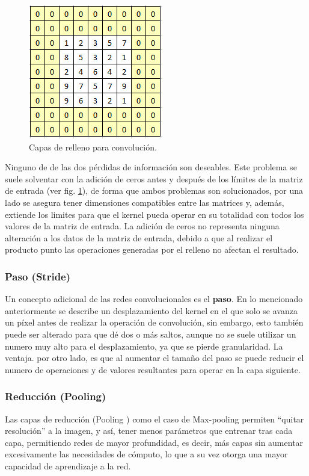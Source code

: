             \begin{figure}[ht!]
            	\centering
            	\includegraphics[width=0.4\linewidth]{imgs/02-Referential/02-Padding.png}
            	\caption[Capas de relleno para convolución]{Capas de relleno para convolución.}
        	    \label{fig:ConvolutionPadding}
            \end{figure}%
            
            Ninguno de de las dos pérdidas de información son deseables. Este problema se suele solventar con la adición de ceros antes y después de los límites de la matriz de entrada (ver fig. \ref{fig:ConvolutionPadding}), de forma que ambos problemas son solucionados, por una lado se asegura tener dimensiones compatibles entre las matrices y, además, extiende los limites para que el kernel pueda operar en su totalidad con todos los valores de la matriz de entrada. La adición de ceros no representa ninguna alteración a los datos de la matriz de entrada, debido a que al realizar el producto punto las operaciones generadas por el relleno no afectan el resultado.
            
        \subsubsection{Paso (Stride)}
            Un concepto adicional de las redes convolucionales es el \textbf{paso}. En lo mencionado anteriormente se describe un desplazamiento del kernel en el que solo se avanza un píxel antes de realizar la operación de convolución, sin embargo, esto también puede ser alterado para que dé dos o más saltos, aunque no se suele utilizar un numero muy alto para el desplazamiento, ya que se pierde granularidad. La ventaja. por otro lado, es que al aumentar el tamaño del paso se puede reducir el numero de operaciones y de valores resultantes para operar en la capa siguiente. 

        \subsubsection{Reducción (Pooling)}
            Las capas de reducción (Pooling ) como el caso de Max-pooling permiten “quitar resolución” a la imagen, y así, tener menos parámetros que entrenar tras cada capa, permitiendo redes de mayor profundidad, es decir, más capas sin aumentar excesivamente las necesidades de cómputo, lo que a su vez otorga una mayor capacidad de aprendizaje a la red.
            
